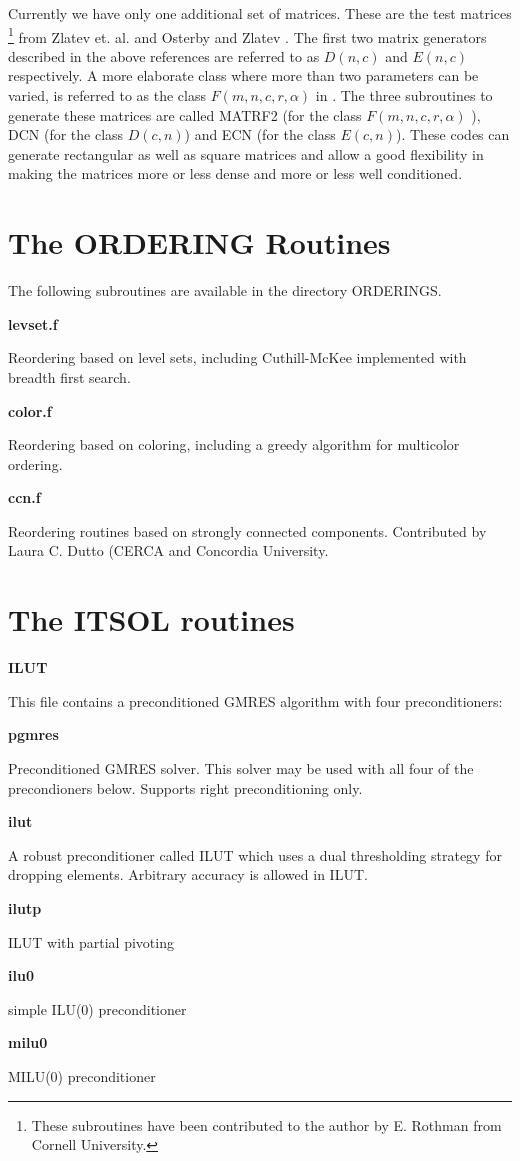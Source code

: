 \documentclass[12pt]{article}
\def\marg#1{\parbox[b]{1.3in}{\bf #1}}
\def\disp#1{\parbox[t]{4.62in}{#1} \vskip 0.2in }
\begin{document}
Currently we have only one additional set of matrices. These are
the test matrices
\footnote{These subroutines have been contributed 
to the author by E. Rothman from Cornell University.} from 
Zlatev et. al. \cite{Zlatev-tests} and Osterby and Zlatev
\cite{OsterbyZlatev-book}. The first two matrix generators
described in the above references 
are referred to as $D(n,c) $ and $E(n,c)$ respectively.
A more elaborate class where more than two parameters can be varied,
is referred to as the class $F(m,n,c,r,\alpha) $ in
\cite{OsterbyZlatev-book,Zlatev-tests}. The three subroutines to generate
these matrices are called MATRF2 (for the class $F(m,n,c,r,\alpha)$ ),
DCN (for the class $D(c,n)$) and ECN (for the class $E(c,n) $).
These codes can generate rectangular as well as square 
matrices and allow a good flexibility in making the matrices 
more or less dense and more or less well conditioned.

\section{The ORDERING Routines}
The following subroutines are available in the directory ORDERINGS.

\vskip 0.3in

\marg{ levset.f }\disp{Reordering based on level sets, including
Cuthill-McKee implemented with breadth first search.}

\marg{ color.f }\disp{Reordering based on coloring, including a greedy 
algorithm for multicolor ordering.}

\marg{ ccn.f }\disp{Reordering routines based on strongly connected
components.  Contributed by Laura C. Dutto (CERCA and Concordia
University.}


\section{The ITSOL routines}

\marg{ILUT}\disp{This file contains a preconditioned GMRES algorithm 
  with four preconditioners:}
\marg{pgmres}\disp{Preconditioned GMRES solver.  This solver may be used
  with all four of the precondioners below.  Supports right preconditioning 
  only.}
\marg{ilut}\disp{ A robust preconditioner called ILUT 
 which uses a dual thresholding strategy for dropping elements.
 Arbitrary accuracy is allowed in ILUT.}
\marg{ilutp}\disp{ ILUT with partial pivoting}
\marg{ilu0}\disp{ simple ILU(0) preconditioner}
\marg{milu0}\disp{ MILU(0) preconditioner}
\end{document}
